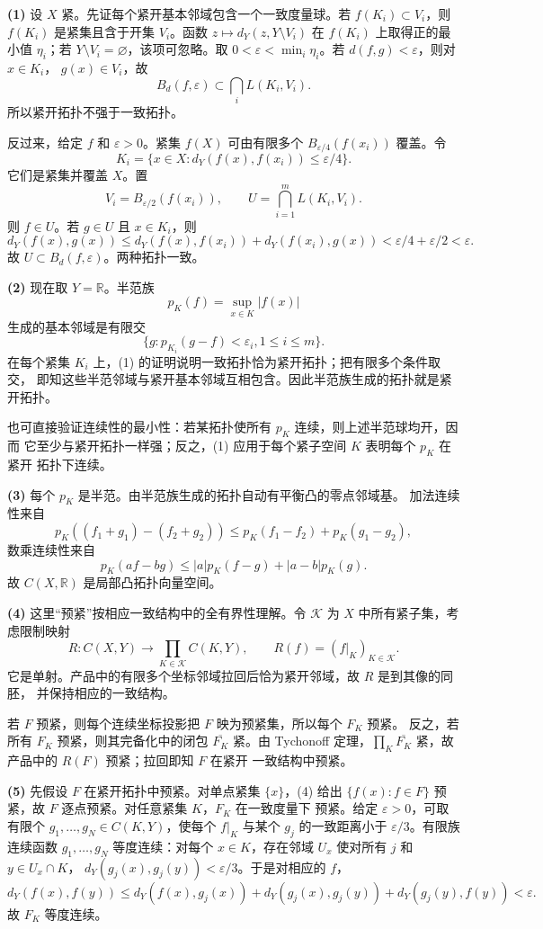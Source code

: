 \textbf{(1)} 设 $X$ 紧。先证每个紧开基本邻域包含一个一致度量球。若
$f(K_i)\subset V_i$，则 $f(K_i)$ 是紧集且含于开集 $V_i$。函数
$z\mapsto d_Y(z,Y\setminus V_i)$ 在 $f(K_i)$ 上取得正的最小值 $\eta_i$；若
$Y\setminus V_i=\varnothing$，该项可忽略。取
$0<\varepsilon<\min_i\eta_i$。若 $d(f,g)<\varepsilon$，则对 $x\in K_i$，
$g(x)\in V_i$，故
\[
 B_d(f,\varepsilon)\subset\bigcap_iL(K_i,V_i).
\]
所以紧开拓扑不强于一致拓扑。

反过来，给定 $f$ 和 $\varepsilon>0$。紧集 $f(X)$ 可由有限多个
$B_{\varepsilon/4}(f(x_i))$ 覆盖。令
\[
 K_i=\{x\in X:d_Y(f(x),f(x_i))\le\varepsilon/4\}.
\]
它们是紧集并覆盖 $X$。置
\[
 V_i=B_{\varepsilon/2}(f(x_i)),\qquad
 U=\bigcap_{i=1}^mL(K_i,V_i).
\]
则 $f\in U$。若 $g\in U$ 且 $x\in K_i$，则
\[
 d_Y(f(x),g(x))
 \le d_Y(f(x),f(x_i))+d_Y(f(x_i),g(x))
 <\varepsilon/4+\varepsilon/2<\varepsilon.
\]
故 $U\subset B_d(f,\varepsilon)$。两种拓扑一致。

\textbf{(2)} 现在取 $Y=\mathbb R$。半范族
\[
 p_K(f)=\sup_{x\in K}|f(x)|
\]
生成的基本邻域是有限交
\[
 \{g:p_{K_i}(g-f)<\varepsilon_i, 1\le i\le m\}.
\]
在每个紧集 $K_i$ 上，(1) 的证明说明一致拓扑恰为紧开拓扑；把有限多个条件取交，
即知这些半范邻域与紧开基本邻域互相包含。因此半范族生成的拓扑就是紧开拓扑。

也可直接验证连续性的最小性：若某拓扑使所有 $p_K$ 连续，则上述半范球均开，因而
它至少与紧开拓扑一样强；反之，(1) 应用于每个紧子空间 $K$ 表明每个 $p_K$ 在紧开
拓扑下连续。

\textbf{(3)} 每个 $p_K$ 是半范。由半范族生成的拓扑自动有平衡凸的零点邻域基。
加法连续性来自
\[
 p_K((f_1+g_1)-(f_2+g_2))
 \le p_K(f_1-f_2)+p_K(g_1-g_2),
\]
数乘连续性来自
\[
 p_K(af-bg)\le |a|p_K(f-g)+|a-b|p_K(g).
\]
故 $C(X,\mathbb R)$ 是局部凸拓扑向量空间。

\textbf{(4)} 这里“预紧”按相应一致结构中的全有界性理解。令 $\mathcal K$ 为 $X$
中所有紧子集，考虑限制映射
\[
 R:C(X,Y)\longrightarrow\prod_{K\in\mathcal K}C(K,Y),\qquad
 R(f)=(f|_K)_{K\in\mathcal K}.
\]
它是单射。产品中的有限多个坐标邻域拉回后恰为紧开邻域，故 $R$ 是到其像的同胚，
并保持相应的一致结构。

若 $F$ 预紧，则每个连续坐标投影把 $F$ 映为预紧集，所以每个 $F_K$ 预紧。
反之，若所有 $F_K$ 预紧，则其完备化中的闭包 $\overline{F_K}$ 紧。由 Tychonoff
定理，$\prod_K\overline{F_K}$ 紧，故产品中的 $R(F)$ 预紧；拉回即知 $F$ 在紧开
一致结构中预紧。

\textbf{(5)} 先假设 $F$ 在紧开拓扑中预紧。对单点紧集 $\{x\}$，(4) 给出
$\{f(x):f\in F\}$ 预紧，故 $F$ 逐点预紧。对任意紧集 $K$，$F_K$ 在一致度量下
预紧。给定 $\varepsilon>0$，可取有限个 $g_1,\dots,g_N\in C(K,Y)$，使每个
$f|_K$ 与某个 $g_j$ 的一致距离小于 $\varepsilon/3$。有限族连续函数
$g_1,\dots,g_N$ 等度连续：对每个 $x\in K$，存在邻域 $U_x$ 使对所有 $j$ 和
$y\in U_x\cap K$，
$d_Y(g_j(x),g_j(y))<\varepsilon/3$。于是对相应的 $f$，
\[
 d_Y(f(x),f(y))
 \le d_Y(f(x),g_j(x))+d_Y(g_j(x),g_j(y))+d_Y(g_j(y),f(y))
 <\varepsilon.
\]
故 $F_K$ 等度连续。

